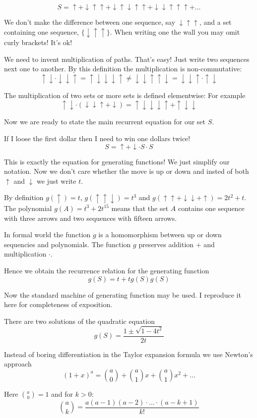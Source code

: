 \documentclass{article}
\newcommand{\up}{\uparrow}
\newcommand{\down}{\downarrow}
\begin{document}
\[
S =  \up + \down\up\up + \down\up\down\up\up + \down\down\up\up\up + \ldots 	
\]

We don't make the difference between one sequence, say $\down\up\up$, and 
a set containing one sequence, $\{\down\up\up \}$. 
When writing one the wall you may omit curly brackets! It's ok!


We need to invent multiplication of paths. That's easy! Just write two sequences next one to another.
By this definition the multiplication is non-commutative:
\[
\up\down \cdot \down \down \up = \up\down \down \down \up  \neq \down \down \up \up\down =  \down \down \up \cdot \up\down 
\]

The multiplication of two sets or more sets is defined elementwise:
For example
\[
	\up\down \cdot (\down \down \up + \down) = \up\down\down \down \up + \up\down \down
\]

Now we are ready to state the main recurrent equation for our set $S$. 


If I loose the first dollar then I need to win one dollars twice!
\[
S = \up + \down \cdot S \cdot S	
\]

This is exactly the equation for generating functions! 
We just simplify our notation. 
Now we don't care whether the move is up or down and insted of both $\up$ and $\down$ we just write $t$. 

By definition $g(\up) = t$, $g(\up\up\down) = t^3$ and $g(\up\up + \down\down +\up) = 2t^2 + t$.
The polynomial $g(A) = t^3 + 2t^{15}$ means that 
the set $A$ contains one sequence with three arrows and two sequences with fifteen arrows.

In formal world the function $g$ is a homomorphism between up or down sequencies and polynomials. 
The function $g$ preserves addition $+$ and multiplication $\cdot$.

Hence we obtain the recurrence relation for the generating function
\[
g(S) = t + t g(S) g(S)	
\]

Now the standard machine of generating function may be used. 
I reproduce it here for completeness of exposition. 

There are two solutions of the quadratic equation
\[
g(S) = \frac{1\pm \sqrt{1 - 4t^2}}{2t}	
\]

Instead of boring differentiation in the Taylor expansion formula we use Newton's approach
\[
(1 + x)^a = \binom{a}{0} + \binom{a}{1} x + \binom{a}{1} x^2 + \ldots 
\]

Here $\binom{a}{0} = 1$ and for $k>0$:
\[
\binom{a}{k} = \frac{a(a-1)(a-2)\cdot \ldots \cdot (a-k + 1)}{k!} 	
\]
\end{document}
